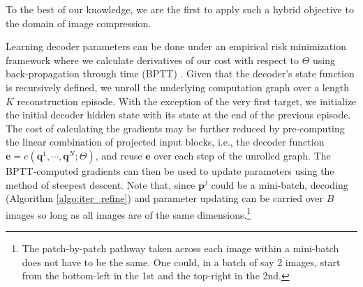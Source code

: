 \documentclass[smallabstract,smallcaptions]{dccpaper}
\begin{document}
To the best of our knowledge, we are the first to apply such a hybrid objective to the domain of image compression.

Learning decoder parameters can be done under an empirical risk minimization framework where we calculate derivatives of our cost with respect to $\Theta$ using back-propagation through time (BPTT) \cite{werbos1988bptt}. Given that the decoder's state function is recursively defined, we unroll the underlying computation graph over a length $K$ reconstruction episode. With the exception of the very first target, we initialize the initial decoder hidden state with its state at the end of the previous episode. The cost of calculating the gradients may be further reduced by pre-computing the linear combination of projected input blocks, i.e., the decoder function $\mathbf{e} = e(\mathbf{q}^1, \cdots, \mathbf{q}^N ; \Theta)$, and reuse $\mathbf{e}$ over each step of the unrolled graph. The BPTT-computed gradients can then be used to update parameters using the method of steepest descent.
Note that, since $\mathbf{p}^j$ could be a mini-batch, decoding (Algorithm \ref{algo:iter_refine}) and parameter updating can be carried over $B$ images so long as all images are of the same dimensions.\footnote{The patch-by-patch pathway taken across each image within a mini-batch does not have to be the same. One could, in a batch of say 2 images, start from the bottom-left in the 1st and the top-right in the 2nd.%
}
\end{document}
